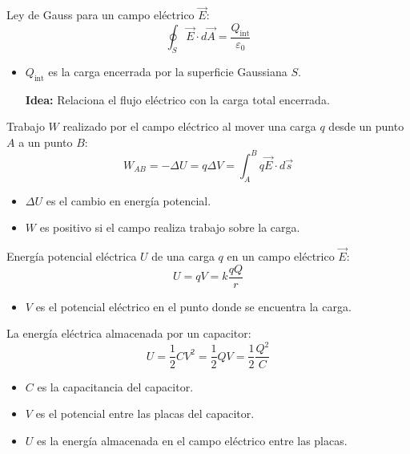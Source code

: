 \begin{tcolorbox}[title=Ley de Gauss]
  Ley de Gauss para un campo eléctrico \(\vec{E}\):
  \[
    \oint_S \vec{E} \cdot d\vec{A} = \frac{Q_{\text{int}}}{\varepsilon_0}
  \]
  \begin{itemize}
    \item \(Q_{\text{int}}\) es la carga encerrada por la superficie Gaussiana \(S\).
    \item[\textbf{Idea:}] Relaciona el flujo eléctrico con la carga total encerrada.
  \end{itemize}  
\end{tcolorbox}

\begin{tcolorbox}[title=Trabajo Eléctrico]
  Trabajo \(W\) realizado por el campo eléctrico al mover una carga \(q\) desde un punto \(A\) a un punto \(B\):
  \[
    W_{AB} = -\Delta U = q \Delta V = \int_{A}^{B} q\vec{E} \cdot d\vec{s}
  \]
  \begin{itemize}
    \item \(\Delta U\) es el cambio en energía potencial.
    \item \(W\) es positivo si el campo realiza trabajo sobre la carga.
  \end{itemize}
\end{tcolorbox}

\begin{tcolorbox}[title=Energía Potencial]
  Energía potencial eléctrica \(U\) de una carga \(q\) en un campo eléctrico \(\vec{E}\):
  \[
    U = qV = k\frac{qQ}{r}
  \]
  \begin{itemize}
    \item \(V\) es el potencial eléctrico en el punto donde se encuentra la carga.
  \end{itemize}
  La energía eléctrica almacenada por un capacitor:
  \[
    U = \frac{1}{2} CV^2 = \frac{1}{2} QV = \frac{1}{2} \frac{Q^2}{C}
  \]
  \begin{itemize}
    \item \(C\) es la capacitancia del capacitor.
    \item \(V\) es el potencial entre las placas del capacitor.
    \item \(U\) es la energía almacenada en el campo eléctrico entre las placas.
  \end{itemize}
\end{tcolorbox}
  
